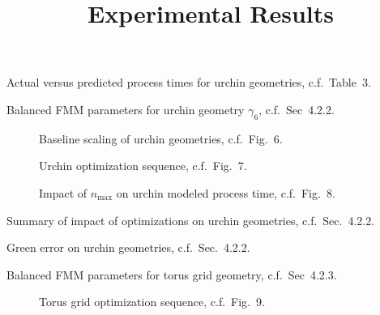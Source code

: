 \documentclass{article}
\title{Experimental Results}
\newcommand{\nmax}{n_{\textrm{max}}}
\begin{document}
\maketitle
\listoftables
\listoffigures

\begin{table}
  \centering
  \caption{Actual versus predicted process times for urchin geometries, c.f.\ Table~3.}
  
\end{table}

\begin{table}
  \centering
  \caption{Balanced FMM parameters for urchin geometry $\gamma_6$, c.f.\ Sec~4.2.2.}
  
\end{table}

\begin{figure}
  \centering
  
  \caption{Baseline scaling of urchin geometries, c.f.\ Fig.~6.}
\end{figure}

\begin{figure}
  \centering
  
  \caption{Urchin optimization sequence, c.f.\ Fig.~7.}
\end{figure}

\begin{figure}
  \centering
  
  \caption{Impact of $\nmax$ on urchin modeled process time, c.f.\ Fig.~8.}
\end{figure}

\begin{table}
  \centering
  \caption{Summary of impact of optimizations on urchin geometries, c.f.\ Sec.~4.2.2.}
    
\end{table}

\begin{table}
  \centering
  \caption{Green error on urchin geometries, c.f.\ Sec.~4.2.2.}
    
\end{table}

\begin{table}
  \centering
  \caption{Balanced FMM parameters for torus grid geometry, c.f.\ Sec~4.2.3.}
  
\end{table}

\begin{figure}
  \centering
  
  \caption{Torus grid optimization sequence, c.f.\ Fig.~9.}
\end{figure}
\end{document}
